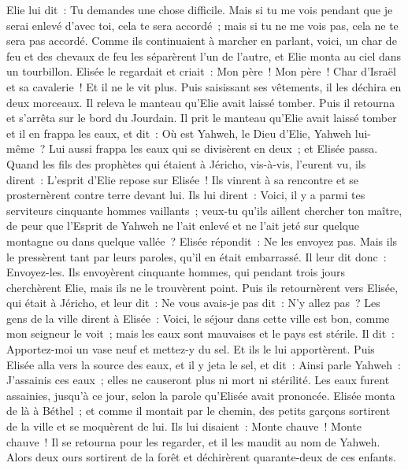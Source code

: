 \begin{multicols}{2}
Elie lui dit~: Tu demandes une chose difficile. Mais si tu me vois pendant que je serai enlevé d'avec toi, cela te sera accordé~; mais si tu ne me vois pas, cela ne te sera pas accordé.
Comme ils continuaient à marcher en parlant, voici, un char de feu et des chevaux de feu les séparèrent l'un de l'autre, et Elie monta au ciel dans un tourbillon.
Elisée le regardait et criait~: Mon père~! Mon père~! Char d'Israël et sa cavalerie~! Et il ne le vit plus. Puis saisissant ses vêtements, il les déchira en deux morceaux.
Il releva le manteau qu'Elie avait laissé tomber. Puis il retourna et s'arrêta sur le bord du Jourdain.
Il prit le manteau qu'Elie avait laissé tomber et il en frappa les eaux, et dit~: Où est Yahweh, le Dieu d'Elie, Yahweh lui-même~? Lui aussi frappa les eaux qui se divisèrent en deux~; et Elisée passa.
Quand les fils des prophètes qui étaient à Jéricho, vis-à-vis, l'eurent vu, ils dirent~: L'esprit d'Elie repose sur Elisée~! Ils vinrent à sa rencontre et se prosternèrent contre terre devant lui.
Ils lui dirent~: Voici, il y a parmi tes serviteurs cinquante hommes vaillants~; veux-tu qu'ils aillent chercher ton maître, de peur que l'Esprit de Yahweh ne l'ait enlevé et ne l'ait jeté sur quelque montagne ou dans quelque vallée~? Elisée répondit~: Ne les envoyez pas.
Mais ils le pressèrent tant par leurs paroles, qu'il en était embarrassé. Il leur dit donc~: Envoyez-les. Ils envoyèrent cinquante hommes, qui pendant trois jours cherchèrent Elie, mais ils ne le trouvèrent point.
Puis ils retournèrent vers Elisée, qui était à Jéricho, et leur dit~: Ne vous avais-je pas dit~: N'y allez pas~?
Les gens de la ville dirent à Elisée~: Voici, le séjour dans cette ville est bon, comme mon seigneur le voit~; mais les eaux sont mauvaises et le pays est stérile.
Il dit~: Apportez-moi un vase neuf et mettez-y du sel. Et ils le lui apportèrent.
Puis Elisée alla vers la source des eaux, et il y jeta le sel, et dit~: Ainsi parle Yahweh~: J'assainis ces eaux~; elles ne causeront plus ni mort ni stérilité.
Les eaux furent assainies, jusqu'à ce jour, selon la parole qu'Elisée avait prononcée.
Elisée monta de là à Béthel~; et comme il montait par le chemin, des petits garçons sortirent de la ville et se moquèrent de lui. Ils lui disaient~: Monte chauve~! Monte chauve~!
Il se retourna pour les regarder, et il les maudit au nom de Yahweh. Alors deux ours sortirent de la forêt et déchirèrent quarante-deux de ces enfants.

\end{multicols}
